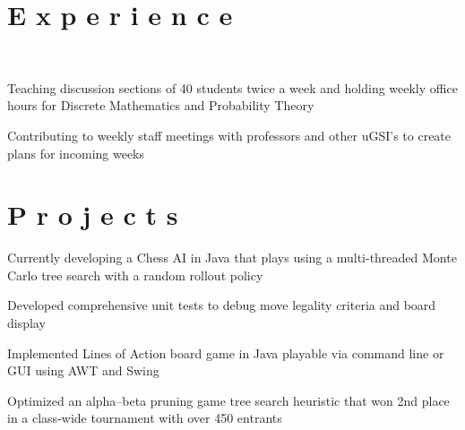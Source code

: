 \documentclass[]{deedy-resume-openfont}
\begin{document}
\begin{minipage}[t]{0.66\textwidth} 


\section{E x p e r i e n c e}
\vspace{4pt}
 \\
\vspace{\topsep} %
\beforetightemize{} %
\begin{tightemize}
\item Teaching discussion sections of 40 students twice a week and holding weekly office hours for Discrete Mathematics and Probability Theory
\item Contributing to weekly staff meetings with professors and other uGSI’s to create plans for incoming weeks
\end{tightemize}
\vspace{4pt}


\section{P r o j e c t s}
\vspace{4pt}
\begin{tightemize}
\item Currently developing a Chess AI in Java that plays using a multi-threaded Monte Carlo tree search with a random rollout policy
\item Developed comprehensive unit tests to debug move legality criteria and board display
\end{tightemize}
\sectionsep

\begin{tightemize}
\item Implemented Lines of Action board game in Java playable via command line or GUI using AWT and Swing
\item Optimized an alpha–beta pruning game tree search heuristic that won 2nd place in a class-wide tournament with over 450 entrants
\end{tightemize}
\sectionsep


\end{minipage}
\end{document}
